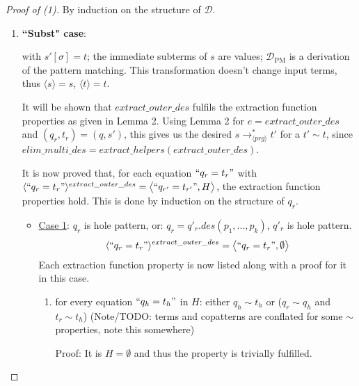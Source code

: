 \documentclass[11pt]{article} %
\begin{document}
\begin{proof}[Proof of (1)] By induction on the structure of $\mathcal{D}$.

\begin{enumerate}
\item \textbf{``Subst" case}:

\begin{prooftree}
\end{prooftree}

with $s'[\sigma] = t$; the immediate subterms of $s$ are values; $\mathcal{D}_{\textrm{PM}}$ is a derivation of the pattern matching. This transformation doesn't change input terms, thus $\langle s \rangle = s$, $\langle t \rangle = t$.

It will be shown that $extract\_outer\_des$ fulfils the extraction function properties as given in Lemma 2. Using Lemma 2 for $e = extract\_outer\_des$ and $(q_r, t_r) = (q, s')$, this gives us the desired $s \longrightarrow_{\langle prg \rangle}^* t'$ for a $t' \sim t$, since $elim\_multi\_des = extract\_helpers(extract\_outer\_des)$.

It is now proved that, for each equation $`` q_r = t_r "$ with $\langle `` q_r = t_r " \rangle^{extract\_outer\_des} = \big\langle `` q_{r'} = t_{r'} ", H \big\rangle$, the extraction function properties hold. This is done by induction on the structure of $q_r$.

\begin{itemize}

\item \underline{Case 1}: $q_r$ is hole pattern, or: $q_r = q'_r.des(p_1, ..., p_k)$, $q'_r$ is hole pattern.
\begin{equation*}
\langle `` q_r = t_r " \rangle^{extract\_outer\_des} = \big\langle `` q_r = t_r ", \emptyset \big\rangle
\end{equation*}
Each extraction function property is now listed along with a proof for it in this case.

\begin{enumerate}
\item for every equation $`` q_h = t_h "$ in $H$: either $q_h \sim t_h$ or ($q_r \sim q_h$ and $t_r \sim t_h$) (Note/TODO: terms and copatterns are conflated for some $\sim$ properties, note this somewhere)

Proof: It is $H = \emptyset$ and thus the property is trivially fulfilled.


\end{enumerate}
\end{itemize}
\end{enumerate}
\end{proof}
\end{document}
